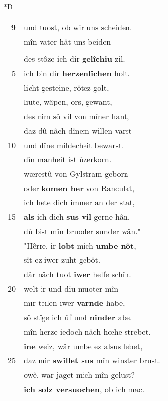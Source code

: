 \documentclass[8pt,a4paper,notitlepage]{article}
\begin{document}
\begin{table}[ht]
\begin{minipage}[t]{0.5\linewidth}
\small
\begin{center}*D
\end{center}
\begin{tabular}{rl}
\textbf{9} & und tuost, ob wir uns scheiden.\\ 
 & mîn vater hât uns beiden\\ 
 & \textbf{\begin{large}G\end{large}elâzen} guotes harte vil.\\ 
 & des stôze ich dir \textbf{gelîchiu} zil.\\ 
5 & ich bin dir \textbf{herzenlîchen} holt.\\ 
 & li\textit{e}ht gesteine, rôtez golt,\\ 
 & liute, wâpen, ors, gewant,\\ 
 & des nim sô vil von mîner hant,\\ 
 & daz dû nâch dînem willen varst\\ 
10 & und dîne mildecheit bewarst.\\ 
 & dîn manheit ist ûzerkorn.\\ 
 & wærestû von Gylstram geborn\\ 
 & oder \textbf{komen her} von Ranculat,\\ 
 & ich hete dich immer an der stat,\\ 
15 & \textbf{als} ich dich \textbf{sus vil} gerne hân.\\ 
 & dû bist mîn bruoder sunder wân."\\ 
 & "Hêrre, ir \textbf{lobt} mich \textbf{umbe nôt},\\ 
 & sît ez iwer zuht gebôt.\\ 
 & dâr nâch tuot \textbf{iwer} helfe schîn.\\ 
20 & welt ir und diu muoter mîn\\ 
 & mir teilen iwer \textbf{varnde} habe,\\ 
 & sô stîge ich ûf und \textbf{ninder} abe.\\ 
 & mîn herze iedoch nâch hœhe strebet.\\ 
 & \textbf{ine} weiz, wâr umbe ez alsus lebet,\\ 
25 & daz mir \textbf{swillet sus} mîn winster brust.\\ 
 & owê, war jaget mich mîn gelust?\\ 
 & \textbf{ich solz versuochen}, ob ich mac.\\ 

\end{tabular}
\end{minipage}
\end{table}
\end{document}
